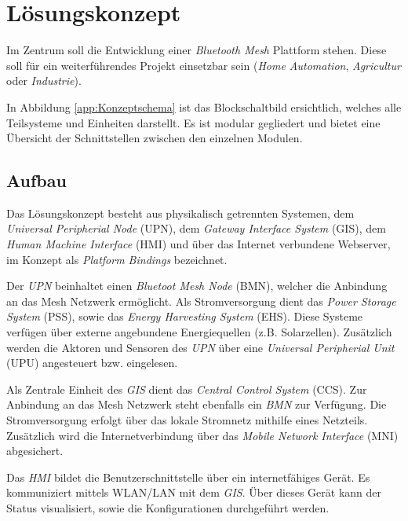 \clearpage
\section{Lösungskonzept}\label{sec:Loesungskonzept}
Im Zentrum soll die Entwicklung einer \textit{Bluetooth Mesh} Plattform stehen. Diese soll für ein weiterführendes Projekt einsetzbar sein (\textit{Home Automation}, \textit{Agricultur} oder \textit{Industrie}). 


In Abbildung \ref{app:Konzeptschema} ist das Blockschaltbild ersichtlich, welches alle Teilsysteme und Einheiten darstellt. Es ist modular gegliedert und bietet eine Übersicht der Schnittstellen zwischen den einzelnen Modulen. 


\subsection{Aufbau}\label{subsec:Loesungskonzept_Aufbau}

Das Lösungskonzept besteht aus physikalisch getrennten Systemen, dem \textit{Universal Peripherial Node} (UPN), dem \textit{Gateway Interface System} (GIS), dem \textit{Human Machine Interface} (HMI) und über das Internet verbundene Webserver, im Konzept als \textit{Platform Bindings} bezeichnet.  

Der \textit{UPN} beinhaltet einen \textit{Bluetoot Mesh Node} (BMN), welcher die Anbindung an das Mesh Netzwerk ermöglicht. Als Stromversorgung dient das \textit{Power Storage System} (PSS), sowie das \textit{Energy Harvesting System} (EHS). Diese Systeme verfügen über externe angebundene Energiequellen (z.B. Solarzellen). Zusätzlich werden die Aktoren und Sensoren des \textit{UPN} über eine \textit{Universal Peripherial Unit} (UPU) angesteuert bzw. eingelesen.

Als Zentrale Einheit des \textit{GIS} dient das \textit{Central Control System} (CCS). Zur Anbindung an das Mesh Netzwerk steht ebenfalls ein \textit{BMN} zur Verfügung. Die Stromversorgung erfolgt über das lokale Stromnetz mithilfe eines Netzteils. Zusätzlich wird die Internetverbindung über das \textit{Mobile Network Interface} (MNI) abgesichert. 

Das \textit{HMI} bildet die Benutzerschnittstelle über ein internetfähiges Gerät. Es kommuniziert mittels WLAN/LAN mit dem \textit{GIS}. Über dieses Gerät kann der Status visualisiert, sowie die Konfigurationen durchgeführt werden.












